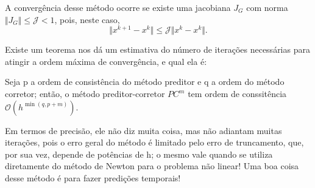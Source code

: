 \documentclass[../differential_methods.tex]{subfiles}
\begin{document}
A convergência desse método ocorre se existe uma jacobiana \(J_{G}\) com norma \(\Vert J_{G} \Vert \leq \mathcal{J}< 1\), pois, neste caso,
\[
	\Vert x^{k+1}-x^{k} \Vert \leq \mathcal{J}\Vert x^{k}-x^{k} \Vert.
\]

Existe um teorema nos dá um estimativa do número de iterações necessárias para atingir a ordem máxima de convergência, e qual ela é:

\begin{theorem*}
	Seja p a ordem de consistência do método preditor e q a ordem do método corretor; então, o método preditor-corretor \(PC^{m}\) tem ordem de conssitência \(\mathcal{O}(h^{\min\limits_{}(q, p+m)})\).
\end{theorem*}

Em termos de precisão, ele não diz muita coisa, mas não adiantam muitas iterações, pois o erro geral do método é limitado pelo erro de truncamento, que, por sua vez, depende de potências de h; o mesmo vale quando se utiliza diretamente do método de Newton para o problema não linear!
Uma boa coisa desse método é para fazer predições temporais!
\end{document}

